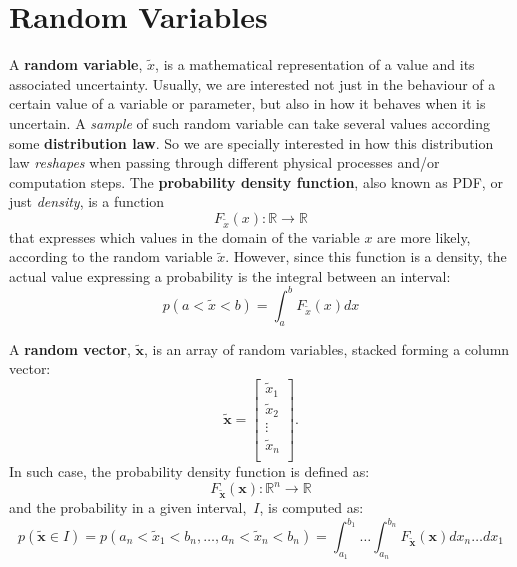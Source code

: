 \section{Random Variables}
\label{sec:random_variables}
A \textbf{random variable}, $\tilde{x}$, is a mathematical representation of a value and its associated uncertainty. Usually, we are interested not just in the behaviour of a certain value of a variable or parameter, but also in how it behaves when it is uncertain. A \textit{sample} of such random variable can take several values according some \textbf{distribution law}. So we are specially interested in how this distribution law \textit{reshapes} when passing through different physical processes and/or computation steps. The \textbf{probability density function}, also known as PDF, or just \textit{density}, is a function 
\begin{equation}
F_{\tilde{x}}(x):\mathbb{R}\rightarrow \mathbb{R} 
\end{equation}
that expresses which values in the domain of the variable $x$ are more likely, according to the random variable $\tilde{x}$. However, since this function is a density, the actual value expressing a probability is the integral between an interval:
\begin{equation}
p(a<\tilde{x}<b) = \int^b_a F_{\tilde{x}}(x) dx 
\end{equation}

A \textbf{random vector}, $\tilde{\mathbf{x}}$, is an array of random variables, stacked forming a column vector: 
\begin{equation}
\tilde{\mathbf{x}} =
\left[
\begin{array}{c}
 \tilde{x}_1\\
 \tilde{x}_2\\
 \vdots \\
 \tilde{x}_n\\
\end{array}
\right].
\end{equation}
In such case, the probability density function is defined as: 
\begin{equation}
F_{\tilde{\mathbf{x}}}(\mathbf{x}):\mathbb{R}^n\rightarrow \mathbb{R} 
\end{equation}
and the probability in a given interval,~$I$, is computed as:
\begin{equation}
p(\tilde{\mathbf{x}}\in I) = 
p(a_n<\tilde{x}_1<b_n,\dots,a_n<\tilde{x}_n<b_n) = 
\int^{b_1}_{a_1} \dots \int^{b_n}_{a_n} F_{\tilde{\mathbf{x}}}(\mathbf{x}) dx_n \dots dx_1 
\end{equation}

